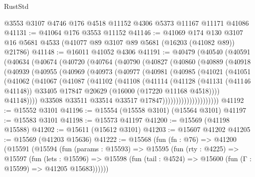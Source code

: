 \begin{lexlean}{RustStd}
\begin{coremodule}
    @3553
    @3107
    @4746
    @176
    @4518
    @11152
    @4306
    @5373
    @11167
    @11171
    @41086
@41131 := @41064 @176 @3553 @11152
@41146 := @41069
    @174
    @130
    @3107
    @16
    @5681
    @4533
    (@41077 @89 @3107 @89 @5681 (@16203 (@41082 @89)) @21786)
@41148 := @16011 @41052 @4306
@41191 := @40479
    (@40540
      (@40591
        (@40634
          (@40674
            (@40720
              (@40764
                (@40790
                  (@40827
                    (@40860
                      (@40889
                        (@40918
                          (@40939
                            (@40955
                              (@40969
                                (@40973
                                  (@40977
                                    (@40981
                                      (@40985
                                        (@41021
                                          (@41051
                                            (@41062
                                              (@41067
                                                (@41087
                                                  (@41102
                                                    (@41108
                                                      (@41114
                                                        (@41128
                                                          (@41131 (@41146 @41148))
                                                          @33405
                                                          @17847
                                                          @20629
                                                          (@16000 (@17220 @11168 @4518))))
                                                      @41148))))
                                              @33508
                                              @33511
                                              @33514
                                              @33517
                                              @17847)))))))))))))))))))))
@41192 := @15552 @3101
@41196 := @15554 (@15558 @3101) (@15564 @3101)
@41197 := @15583 @3101
@41198 := @15573 @41197
@41200 := @15569 (@41198 @15588)
@41202 := @15611 (@15612 @3101)
@41203 := @15607 @41202
@41205 := @15569 (@41203 @15636)
@41222 := @15568
    (fun (fn : @76) =>
    @41200
      (@15591
        (@15594
          (fun (params : @15593) =>
          @15595
            (fun (rty : @4225) =>
            @15597
              (fun (lets : @15596) =>
              @15598 (fun (tail : @4524) => @15600 (fun (Γ : @15599) => @41205 @15683))))))

\end{coremodule}
\end{lexlean}
